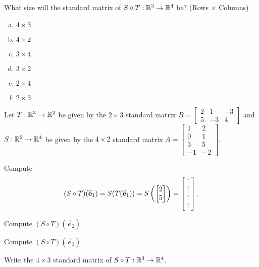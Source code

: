 \begin{applicationActivities}
\begin{activity}{2}
What size will the standard matrix of $S \circ T:\mathbb{R}^3\to\mathbb{R}^4$ be?
(Rows \(\times\) Columns)
\begin{multicols}{3}
\begin{enumerate}[(a)]
\item $4 \times 3$
\item $4 \times 2$
\item $3 \times 4$
\item $3 \times 2$
\item $2 \times 4$
\item $2 \times 3$
\end{enumerate}
\end{multicols}
\end{activity}

\begin{activity}{15}
Let $T: \mathbb{R}^3 \rightarrow \mathbb{R}^2$ be given by the \(2\times 3\) standard matrix $B=\begin{bmatrix} 2 & 1 & -3 \\ 5 & -3 & 4 \end{bmatrix}$ and $S: \mathbb{R}^2 \rightarrow \mathbb{R}^4$ be given by the \(4\times 2\) standard matrix $A=\begin{bmatrix} 1 & 2 \\ 0 & 1 \\ 3 & 5 \\ -1 & -2 \end{bmatrix}$.

\begin{subactivity}
Compute
\[
  (S \circ T)(\vec{e}_1)
    =
  S(T(\vec{e}_1))
    =
  S\left(\begin{bmatrix} 2 \\ 5\end{bmatrix}\right)
        =
  \begin{bmatrix}\unknown\\\unknown\\\unknown\\\unknown\end{bmatrix}.
\]

\end{subactivity}
\begin{subactivity}
Compute
\(
  (S \circ T)(\vec{e}_2)
\).
\end{subactivity}
\begin{subactivity}
Compute
\(
  (S \circ T)(\vec{e}_3)
\).
\end{subactivity}
\begin{subactivity}
Write the \(4\times 3\) standard matrix of $S \circ T:\mathbb{R}^3\to\mathbb{R}^4$.
\end{subactivity}
\end{activity}


\end{applicationActivities}
